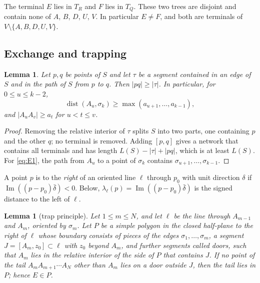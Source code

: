 \documentclass[11pt]{amsart}
\newtheorem{lemma}[theorem]{Lemma}
\theoremstyle{definition}
\theoremstyle{remark}
\numberwithin{equation}{section}
\newcommand{\dist}{\operatorname{dist}}
\begin{document}
The terminal $E$ lies in $T_R$ and $F$ lies in $T_Q$. These two trees are disjoint and contain none of $A$, $B$, $D$, $U$, $V$. In particular $E\ne F$, and both are terminals of $V\setminus\{A,B,D,U,V\}$.

\subsection{Exchange and trapping}

\begin{lemma}\label{lem:exch}
Let $p,q$ be points of $S$ and let $\tau$ be a segment contained in an edge of $S$ and in the path of $S$ from $p$ to $q$. Then $|pq|\ge|\tau|$. In particular, for $0\le u\le k-2$,
\begin{equation}\label{eq:E1}
\dist(A_u,\sigma_k)\ge\max(a_{u+1},\dots,a_{k-1}),
\end{equation}
and $|A_uA_v|\ge a_t$ for $u<t\le v$.
\end{lemma}

\begin{proof}
Removing the relative interior of $\tau$ splits $S$ into two parts, one containing $p$ and the other $q$; no terminal is removed. Adding $[p,q]$ gives a network that contains all terminals and has length $L(S)-|\tau|+|pq|$, which is at least $L(S)$. For \eqref{eq:E1}, the path from $A_u$ to a point of $\sigma_k$ contains $\sigma_{u+1},\dots,\sigma_{k-1}$.
\end{proof}

A point $p$ is to the \emph{right} of an oriented line $\ell$ through $p_0$ with unit direction $\delta$ if $\operatorname{Im}((p-p_0)\bar\delta)<0$. Below, $\lambda_\ell(p)=\operatorname{Im}((p-p_0)\bar\delta)$ is the signed distance to the left of $\ell$.

\begin{lemma}[trap principle]\label{lem:trapprinciple}
Let $1\le m\le N$, and let $\ell$ be the line through $A_{m-1}$ and $A_m$, oriented by $\sigma_m$. Let $P$ be a simple polygon in the closed half-plane to the right of $\ell$ whose boundary consists of pieces of the edges $\sigma_1,\dots,\sigma_m$, a segment $J=[A_m,z_0]\subset\ell$ with $z_0$ beyond $A_m$, and further segments called doors, such that $A_m$ lies in the relative interior of the side of $P$ that contains $J$. If no point of the tail $A_mA_{m+1}\cdots A_N$ other than $A_m$ lies on a door outside $J$, then the tail lies in $P$; hence $E\in P$.
\end{lemma}
\end{document}
